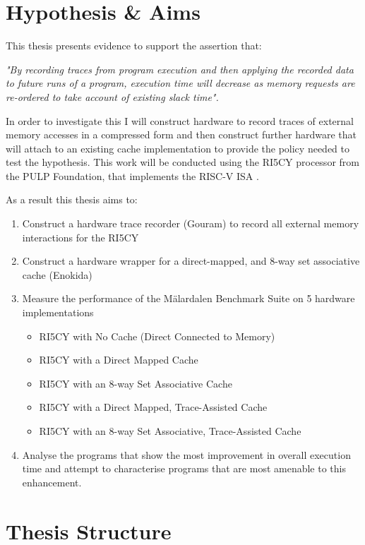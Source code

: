 \section{Hypothesis \& Aims}

This thesis presents evidence to support the assertion that:

\emph{"By recording traces from program execution and then applying the recorded data to future runs of a program, execution time will decrease as memory requests are re-ordered to take account of existing slack time".}

In order to investigate this I will construct hardware to record traces of external memory accesses in a compressed form and then construct further hardware that will attach to an existing cache implementation to provide the policy needed to test the hypothesis. This work will be conducted using the RI5CY processor \cite{gautschiNearThresholdRISCVCore2017} from the PULP Foundation, that implements the RISC-V ISA \cite{watermanRISCVInstructionSet2019}.

As a result this thesis aims to:

\begin{enumerate}
	\item Construct a hardware trace recorder (Gouram) to record all external memory interactions for the RI5CY
	\item Construct a hardware wrapper for a direct-mapped, and 8-way set associative cache (Enokida) 
	\item Measure the performance of the Mälardalen Benchmark Suite \cite{gustafssonMalardalenWCETBenchmarks2010} on 5 hardware implementations
	\begin{itemize}
		\item RI5CY with No Cache (Direct Connected to Memory)
		\item RI5CY with a Direct Mapped Cache
		\item RI5CY with an 8-way Set Associative Cache
		\item RI5CY with a Direct Mapped, Trace-Assisted Cache
		\item RI5CY with an 8-way Set Associative, Trace-Assisted Cache
	\end{itemize}
	\item Analyse the programs that show the most improvement in overall execution time and attempt to characterise programs that are most amenable to this enhancement.
\end{enumerate}

\section{Thesis Structure}


